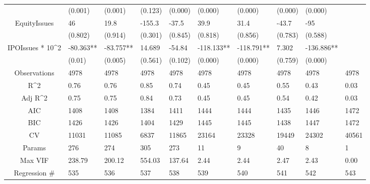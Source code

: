 \documentclass{article}
\begin{document}
\begin{table}[H]
\begin{tabular}{|clllllllll|}
   & (0.001) & (0.001) & (0.123) & (0.000) & (0.000) & (0.000) & (0.000) & (0.000) &  \\ 
  EquityIssues & 46 & 19.8 & -155.3 & -37.5 & 39.9 & 31.4 & -43.7 & -95 &  \\ 
   & (0.802) & (0.914) & (0.301) & (0.845) & (0.818) & (0.856) & (0.783) & (0.588) &  \\ 
  IPOIssues * 10^2 & -80.363** & -83.757** & 14.689 & -54.84 & -118.133** & -118.791** & 7.302 & -136.886** &  \\ 
   & (0.01) & (0.005) & (0.561) & (0.102) & (0.000) & (0.000) & (0.759) & (0.000) &  \\ 
  \hline 
 Observations & 4978 & 4978 & 4978 & 4978 & 4978 & 4978 & 4978 & 4978 & 4978 \\ 
  R^2 & 0.76 & 0.76 & 0.85 & 0.74 & 0.45 & 0.45 & 0.55 & 0.43 & 0.03 \\ 
  Adj R^2 & 0.75 & 0.75 & 0.84 & 0.73 & 0.45 & 0.45 & 0.54 & 0.42 & 0.03 \\ 
  AIC & 1408 & 1408 & 1384 & 1411 & 1444 & 1444 & 1435 & 1446 & 1472 \\ 
  BIC & 1426 & 1426 & 1404 & 1429 & 1445 & 1445 & 1438 & 1447 & 1472 \\ 
  CV & 11031 & 11085 & 6837 & 11865 & 23164 & 23328 & 19449 & 24302 & 40561 \\ 
  Params & 276 & 274 & 305 & 273 & 11 & 9 & 40 & 8 & 1 \\ 
  Max VIF & 238.79 & 200.12 & 554.03 & 137.64 & 2.44 & 2.44 & 2.47 & 2.43 & 0.00 \\ 
  Regression \# & 535 & 536 & 537 & 538 & 539 & 540 & 541 & 542 & 543 \\ 
   \hline
\end{tabular}
 
\end{table}
\end{document}
